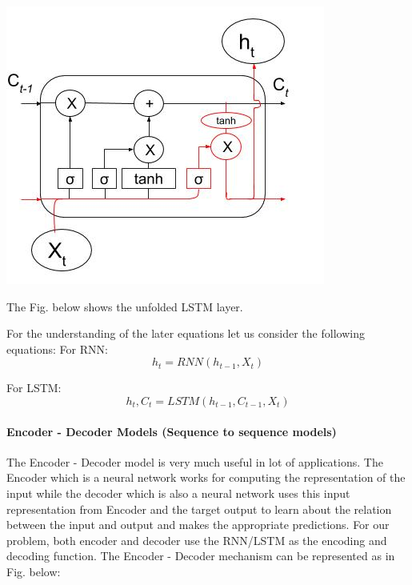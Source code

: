 				\begin{center}
				\includegraphics[width=\linewidth]{figures/output-gate.jpg}	
				\label{fig: Output Gate}
				\end{center}

The Fig. below shows the unfolded LSTM layer.

For the understanding of the later equations let us consider the following equations:
For RNN: \begin{equation} h_{t} = RNN(h_{t-1}, X_{t}) \end{equation}

For LSTM: \begin{equation} h_{t}, C_{t} = LSTM(h_{t-1}, C_{t-1}, X_{t}) \end{equation} 

\paragraph{Encoder - Decoder Models (Sequence to sequence models)}

The Encoder - Decoder model \cite{12} is very much useful in lot of applications. The Encoder which is a neural network works for computing the representation of the input while the decoder which is also a neural network uses this input representation from Encoder and the target output to learn about the relation between the input and output and makes the appropriate predictions. For our problem, both encoder and decoder use the RNN/LSTM as the encoding and decoding function. The Encoder - Decoder mechanism can be represented as in Fig. below:

